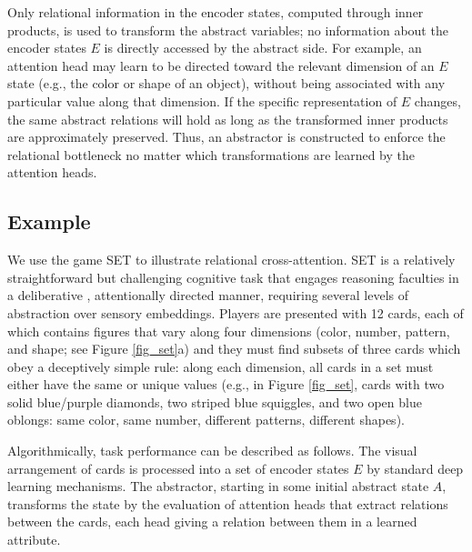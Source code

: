 Only relational information in the encoder states, computed through inner products,
is used to transform the abstract variables; no information about the encoder states $E$ is directly accessed by the abstract side. For example, an attention head may learn to be directed toward the relevant dimension of an $E$ state (e.g., the color or shape of an object), without being associated with any particular value along that dimension. If the specific representation of $E$ changes, the same abstract relations will hold as long as the transformed inner products are approximately preserved. Thus, an abstractor is constructed to enforce the relational bottleneck 
no matter which transformations are learned by the attention heads.



\subsection{Example}
\label{ssec:set}

We use the game SET to illustrate relational cross-attention.
SET is a relatively straightforward but challenging cognitive task that engages reasoning faculties in a deliberative
, attentionally directed manner, requiring several levels of abstraction over sensory embeddings. Players are
presented with 12 cards, each of which contains figures that vary along four dimensions (color, number, pattern, and
shape; see Figure \ref{fig_set}a) and they must find subsets of three cards which obey a deceptively simple rule: along each dimension, all cards in a set must either have the same or unique values (e.g., in Figure \ref{fig_set}, cards with two solid blue/purple diamonds, two striped blue squiggles, and two open blue oblongs: same color, same number, different patterns, different shapes).

Algorithmically, task performance can be described as follows. The visual arrangement of cards is processed into a set of encoder states $E$ by standard deep learning mechanisms. The abstractor, starting in some initial abstract state $A$, transforms the state by the evaluation of attention heads that extract relations between the cards, each head giving a relation between them in a learned attribute.

\def\redcard{\colorbox{red!30}{R}\hskip.2em}
\def\bluecard{\colorbox{blue!30}{B}\hskip.2em}
\def\greencard{\colorbox{green!50}{G}\hskip.2em}
\def\onecard{\fbox{\hskip1pt 1\hskip1pt}\hskip.2em}
\def\twocard{\fbox{\hskip1pt 2\hskip1pt}\hskip.2em}
\def\threecard{\fbox{\hskip1pt 3\hskip1pt}\hskip.2em}


